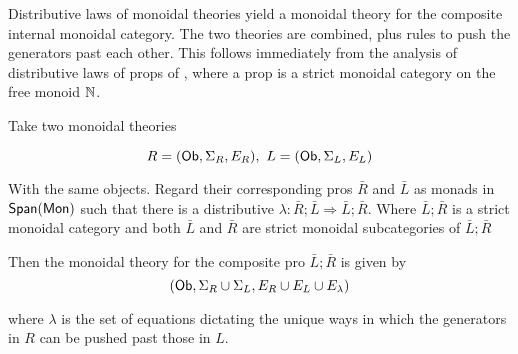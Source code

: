 Distributive laws of monoidal theories yield a monoidal theory for the composite internal monoidal category. The two theories are combined,  plus rules to push the generators past each other.  This follows immediately from the analysis of distributive laws of props of \cite[Theorem 3.8]{lack}, where a prop is a strict monoidal category on the free monoid $\mathbb{N}$.  

\begin{lemma}
Take two monoidal theories

$$
R=({\sf Ob},\Sigma_R ,E_R ), \ L=({\sf Ob},\Sigma_L ,E_L )
$$

With the same objects.  Regard their corresponding pros $\bar{R}$ and $\bar{L}$ as monads in $\mathsf{Span}({\sf Mon})$ such that there is a distributive $\lambda:\bar{R};\bar{L} \Rightarrow \bar{L};\bar{R}$.  Where $ \bar{L};\bar{R}$ is a strict monoidal category and both $\bar L$ and $\bar R$ are strict monoidal subcategories of   $\bar{L};\bar{R}$


Then the monoidal theory for the composite pro $\bar{L};\bar{R}$ is given by 
$$
({\sf Ob}, \Sigma_R\cup \Sigma_L, E_R\cup E_L \cup E_\lambda)
$$

where $\lambda$ is the set of equations dictating the unique ways in which the generators in $R$ can be pushed past those in $L$.
\end{lemma}






